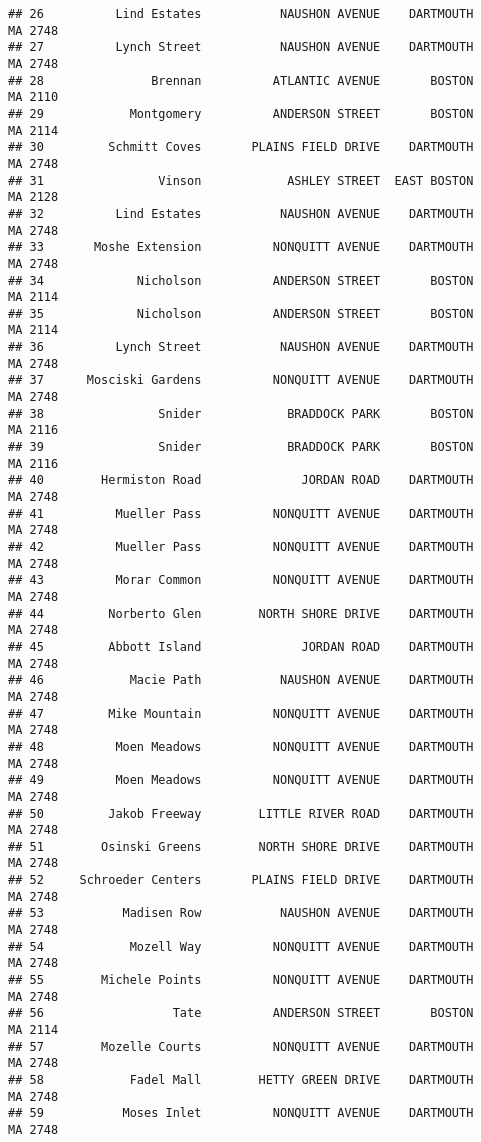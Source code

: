 \documentclass[
]{article}
\begin{document}
\begin{verbatim}
## 26          Lind Estates           NAUSHON AVENUE    DARTMOUTH    MA 2748
## 27          Lynch Street           NAUSHON AVENUE    DARTMOUTH    MA 2748
## 28               Brennan          ATLANTIC AVENUE       BOSTON    MA 2110
## 29            Montgomery          ANDERSON STREET       BOSTON    MA 2114
## 30         Schmitt Coves       PLAINS FIELD DRIVE    DARTMOUTH    MA 2748
## 31                Vinson            ASHLEY STREET  EAST BOSTON    MA 2128
## 32          Lind Estates           NAUSHON AVENUE    DARTMOUTH    MA 2748
## 33       Moshe Extension          NONQUITT AVENUE    DARTMOUTH    MA 2748
## 34             Nicholson          ANDERSON STREET       BOSTON    MA 2114
## 35             Nicholson          ANDERSON STREET       BOSTON    MA 2114
## 36          Lynch Street           NAUSHON AVENUE    DARTMOUTH    MA 2748
## 37      Mosciski Gardens          NONQUITT AVENUE    DARTMOUTH    MA 2748
## 38                Snider            BRADDOCK PARK       BOSTON    MA 2116
## 39                Snider            BRADDOCK PARK       BOSTON    MA 2116
## 40        Hermiston Road              JORDAN ROAD    DARTMOUTH    MA 2748
## 41          Mueller Pass          NONQUITT AVENUE    DARTMOUTH    MA 2748
## 42          Mueller Pass          NONQUITT AVENUE    DARTMOUTH    MA 2748
## 43          Morar Common          NONQUITT AVENUE    DARTMOUTH    MA 2748
## 44         Norberto Glen        NORTH SHORE DRIVE    DARTMOUTH    MA 2748
## 45         Abbott Island              JORDAN ROAD    DARTMOUTH    MA 2748
## 46            Macie Path           NAUSHON AVENUE    DARTMOUTH    MA 2748
## 47         Mike Mountain          NONQUITT AVENUE    DARTMOUTH    MA 2748
## 48          Moen Meadows          NONQUITT AVENUE    DARTMOUTH    MA 2748
## 49          Moen Meadows          NONQUITT AVENUE    DARTMOUTH    MA 2748
## 50         Jakob Freeway        LITTLE RIVER ROAD    DARTMOUTH    MA 2748
## 51        Osinski Greens        NORTH SHORE DRIVE    DARTMOUTH    MA 2748
## 52     Schroeder Centers       PLAINS FIELD DRIVE    DARTMOUTH    MA 2748
## 53           Madisen Row           NAUSHON AVENUE    DARTMOUTH    MA 2748
## 54            Mozell Way          NONQUITT AVENUE    DARTMOUTH    MA 2748
## 55        Michele Points          NONQUITT AVENUE    DARTMOUTH    MA 2748
## 56                  Tate          ANDERSON STREET       BOSTON    MA 2114
## 57        Mozelle Courts          NONQUITT AVENUE    DARTMOUTH    MA 2748
## 58            Fadel Mall        HETTY GREEN DRIVE    DARTMOUTH    MA 2748
## 59           Moses Inlet          NONQUITT AVENUE    DARTMOUTH    MA 2748

\end{verbatim}
\end{document}
